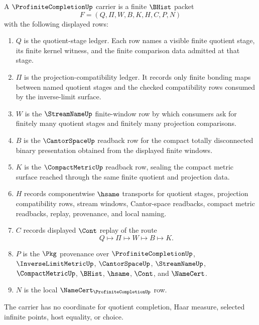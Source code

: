 \begin{definition}
\label{def:profinite-completion-carrier}
A $\ProfiniteCompletionUp$ carrier is a finite $\BHist$ packet
$$
F=(Q,\Pi,W,B,K,H,C,P,N)
$$
with the following displayed rows:
\begin{enumerate}
\item $Q$ is the quotient-stage ledger. Each row names a visible finite quotient stage, its finite kernel witness, and the finite comparison data admitted at that stage.
\item $\Pi$ is the projection-compatibility ledger. It records only finite bonding maps between named quotient stages and the checked compatibility rows consumed by the inverse-limit surface.
\item $W$ is the $\StreamNameUp$ finite-window row by which consumers ask for finitely many quotient stages and finitely many projection comparisons.
\item $B$ is the $\CantorSpaceUp$ readback row for the compact totally disconnected binary presentation obtained from the displayed finite windows.
\item $K$ is the $\CompactMetricUp$ readback row, sealing the compact metric surface reached through the same finite quotient and projection data.
\item $H$ records componentwise $\hsame$ transports for quotient stages, projection compatibility rows, stream windows, Cantor-space readbacks, compact metric readbacks, replay, provenance, and local naming.
\item $C$ records displayed $\Cont$ replay of the route
$$
Q\longmapsto \Pi\longmapsto W\longmapsto B\longmapsto K .
$$
\item $P$ is the $\Pkg$ provenance over $\ProfiniteCompletionUp$, $\InverseLimitMetricUp$, $\CantorSpaceUp$, $\StreamNameUp$, $\CompactMetricUp$, $\BHist$, $\hsame$, $\Cont$, and $\NameCert$.
\item $N$ is the local $\NameCert_{\ProfiniteCompletionUp}$ row.
\end{enumerate}
The carrier has no coordinate for quotient completion, Haar measure, selected infinite points, host equality, or choice.
\end{definition}

